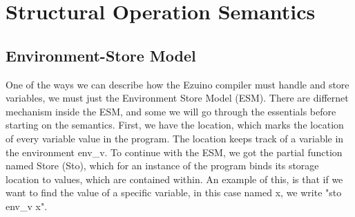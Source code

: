 \section{Structural Operation Semantics}
\subsection{Environment-Store Model}
One of the ways we can describe how the Ezuino compiler must handle and store variables, we must just the Environment Store Model (ESM). There are differnet mechanism inside the ESM, and some we will go through the essentials before starting on the semantics. First, we have the location, which marks the location of every variable value in the program. The location keeps track of a variable in the environment {env_v}.
To continue with the ESM, we got the partial function named Store (Sto), which for an instance of the program binds its storage location to values, which are contained within. An example of this, is that if we want to find the value of a specific variable, in this case named x, we write "sto env_v x".